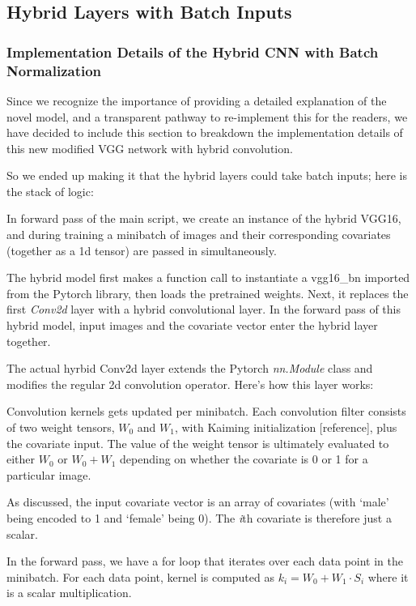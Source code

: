 \documentclass[12pt]{article}
\begin{document}
\subsection{Hybrid Layers with Batch Inputs}

\subsubsection{Implementation Details of the Hybrid CNN with Batch Normalization}

Since we recognize the importance of providing a detailed explanation of the novel model, and a transparent pathway to re-implement this for the readers, we have decided to include this section to breakdown the implementation details of this new modified VGG network with hybrid convolution.

So we ended up making it that the hybrid layers could take batch inputs; here is the stack of logic:

In forward pass of the main script, we create an instance of the hybrid VGG16, and during training a minibatch of images and their corresponding covariates (together as a 1d tensor) are passed in simultaneously.

The hybrid model first makes a function call to instantiate a vgg16\_bn imported from the Pytorch library, then loads the pretrained weights. Next, it replaces the first \textit{Conv2d} layer with a hybrid convolutional layer. In the forward pass of this hybrid model, input images and the covariate vector enter the hybrid layer together.

The actual hyrbid Conv2d layer extends the Pytorch \textit{nn.Module} class and modifies the regular 2d convolution operator. Here's how this layer works:

Convolution kernels gets updated per minibatch. Each convolution filter consists of two weight tensors, $W_0$ and $W_1$, with Kaiming initialization [reference], plus the covariate input. The value of the weight tensor is ultimately evaluated to either $W_0$ or $W_0+W_1$ depending on whether the covariate is 0 or 1 for a particular image. 

As discussed, the input covariate vector is an array of covariates (with `male' being encoded to 1 and `female' being 0). The \textit{i}th covariate is therefore just a scalar. 

In the forward pass, we have a for loop that iterates over each data point in the minibatch. For each data point, kernel is computed as $k_i = W_0 + W_1 \cdot S_i$ where it is a scalar multiplication.
\end{document}
